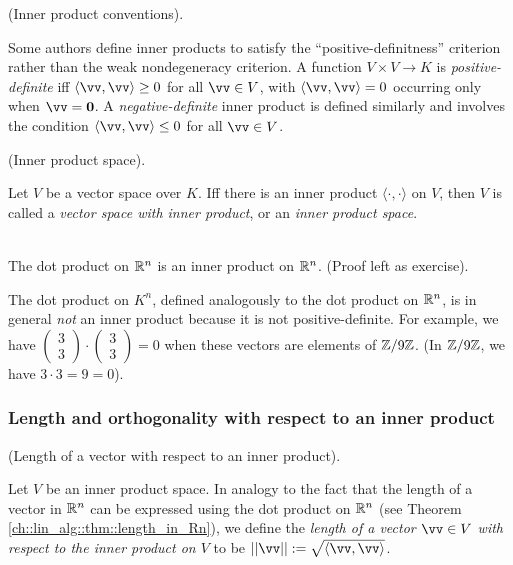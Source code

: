 \begin{remark}
    (Inner product conventions).

    Some authors define inner products to satisfy the ``positive-definitness'' criterion rather than the weak nondegeneracy criterion. A function $V \times V \rightarrow K$ is \textit{positive-definite} iff $\langle \vv, \vv \rangle \geq 0$ for all $\vv \in V$, with $\langle \vv, \vv \rangle = 0$ occurring only when $\vv = \mathbf{0}$. A \textit{negative-definite} inner product is defined similarly and involves the condition $\langle \vv, \vv \rangle \leq 0$ for all $\vv \in V$.
\end{remark}

\begin{defn}
    (Inner product space).
    
    Let $V$ be a vector space over $K$. Iff there is an inner product $\langle \cdot, \cdot \rangle$ on $V$, then $V$ is called a \textit{vector space with inner product}, or an \textit{inner product space}.
\end{defn}

\begin{example}
    \mbox{} \\ \indent
    The dot product on $\mathbb{R}^n$ is an inner product on $\mathbb{R}^n$. (Proof left as exercise). 
    
    The dot product on $K^n$, defined analogously to the dot product on $\mathbb{R}^n$, is in general \textit{not} an inner product because it is not positive-definite. For example, we have $\begin{pmatrix} 3 \\ 3 \end{pmatrix} \cdot \begin{pmatrix} 3 \\ 3 \end{pmatrix} = 0$ when these vectors are elements of $\mathbb{Z}/9\mathbb{Z}$. (In $\mathbb{Z}/9\mathbb{Z}$, we have $3 \cdot 3 = 9 = 0$).
\end{example}

\subsubsection*{Length and orthogonality with respect to an inner product}

\begin{defn}
    (Length of a vector with respect to an inner product). 
    
    Let $V$ be an inner product space. In analogy to the fact that the length of a vector in $\mathbb{R}^n$ can be expressed using the dot product on $\mathbb{R}^n$ (see Theorem \ref{ch::lin_alg::thm::length_in_Rn}), we define the \textit{length of a vector $\vv \in V$ with respect to the inner product on $V$} to be $||\vv|| := \sqrt{\langle \vv, \vv \rangle}$.
\end{defn}

